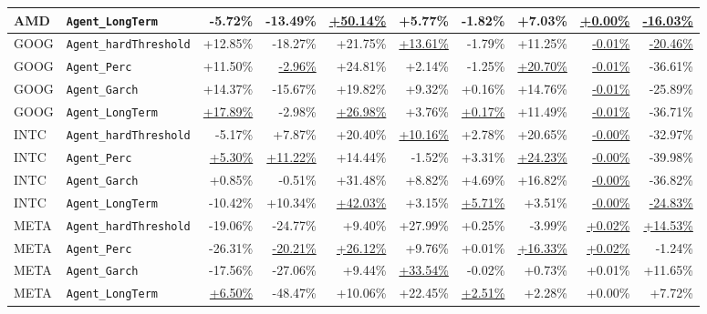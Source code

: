 ﻿\documentclass{article}
\begin{document}
\begin{longtable}{llrrrrrrrr}
AMD  & \texttt{Agent\_LongTerm}      & -5.72\%  & -13.49\% & \underline{+50.14\%} & +5.77\%  & -1.82\% & +7.03\%  & \underline{+0.00\%} & \underline{-16.03\%} \\
\midrule
GOOG & \texttt{Agent\_hardThreshold} & +12.85\% & -18.27\% & +21.75\% & \underline{+13.61\%} & -1.79\% & +11.25\% & \underline{-0.01\%} & \underline{-20.46\%} \\
GOOG & \texttt{Agent\_Perc}          & +11.50\% & \underline{-2.96\%}  & +24.81\% & +2.14\%  & -1.25\% & \underline{+20.70\%} & \underline{-0.01\%} & -36.61\% \\
GOOG & \texttt{Agent\_Garch}         & +14.37\% & -15.67\% & +19.82\% & +9.32\%  & +0.16\% & +14.76\% & \underline{-0.01\%} & -25.89\% \\
GOOG & \texttt{Agent\_LongTerm}      & \underline{+17.89\%} & -2.98\%  & \underline{+26.98\%} & +3.76\%  & \underline{+0.17\%} & +11.49\% & \underline{-0.01\%} & -36.71\% \\
\midrule
INTC & \texttt{Agent\_hardThreshold} & -5.17\%  & +7.87\%  & +20.40\% & \underline{+10.16\%} & +2.78\% & +20.65\% & \underline{-0.00\%} & -32.97\% \\
INTC & \texttt{Agent\_Perc}          & \underline{+5.30\%}  & \underline{+11.22\%} & +14.44\% & -1.52\%  & +3.31\% & \underline{+24.23\%} & \underline{-0.00\%} & -39.98\% \\
INTC & \texttt{Agent\_Garch}         & +0.85\%  & -0.51\%  & +31.48\% & +8.82\%  & +4.69\% & +16.82\% & \underline{-0.00\%} & -36.82\% \\
INTC & \texttt{Agent\_LongTerm}      & -10.42\% & +10.34\% & \underline{+42.03\%} & +3.15\%  & \underline{+5.71\%} & +3.51\%  & \underline{-0.00\%} & \underline{-24.83\%} \\
\midrule
META & \texttt{Agent\_hardThreshold} & -19.06\% & -24.77\% & +9.40\%  & +27.99\% & +0.25\% & -3.99\%  & \underline{+0.02\%} & \underline{+14.53\%} \\
META & \texttt{Agent\_Perc}          & -26.31\% & \underline{-20.21\%} & \underline{+26.12\%} & +9.76\%  & +0.01\% & \underline{+16.33\%} & \underline{+0.02\%} & -1.24\% \\
META & \texttt{Agent\_Garch}         & -17.56\% & -27.06\% & +9.44\%  & \underline{+33.54\%} & -0.02\% & +0.73\%  & +0.01\% & +11.65\% \\
META & \texttt{Agent\_LongTerm}      & \underline{+6.50\%}  & -48.47\% & +10.06\% & +22.45\% & \underline{+2.51\%} & +2.28\%  & +0.00\% & +7.72\% \\
\midrule

\end{longtable}
\end{document}
